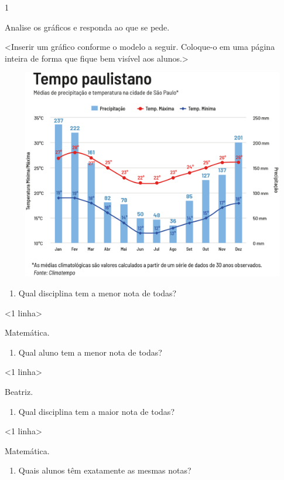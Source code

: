 {{{{{{{{{{{{{{{{{

\num{1}

Analise os gráficos e responda ao que se pede.

\textless{}Inserir um gráfico conforme o modelo a seguir. Coloque-o em
uma página inteira de forma que fique bem visível aos
alunos.\textgreater{}

\includegraphics[width=7.80208in,height=3.62472in]{media/image91.png}

\begin{enumerate}
\def\labelenumi{\alph{enumi})}
\item
  Qual disciplina tem a menor nota de todas?
\end{enumerate}

\textless{}1 linha\textgreater{}

Matemática.

\begin{enumerate}
\def\labelenumi{\alph{enumi})}
\item
  Qual aluno tem a menor nota de todas?
\end{enumerate}

\textless{}1 linha\textgreater{}

Beatriz.

\begin{enumerate}
\def\labelenumi{\alph{enumi})}
\item
  Qual disciplina tem a maior nota de todas?
\end{enumerate}

\textless{}1 linha\textgreater{}

Matemática.

\begin{enumerate}
\def\labelenumi{\alph{enumi})}
\item
  Quais alunos têm exatamente as mesmas notas?
\end{enumerate}

}}}}}}}}}}}}}}}}}
